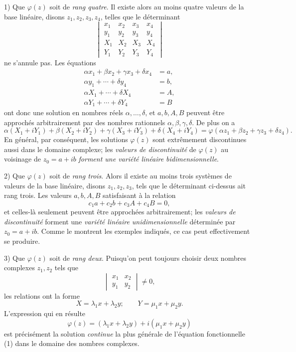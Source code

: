 1) Que $\varphi(z)$ soit de \emph{rang quatre}. Il existe alors au moins quatre valeurs de la base linéaire, disons $z_1,z_2,z_3,z_4$, telles que le déterminant
\[
\begin{vmatrix}
x_1&x_2&x_3&x_4\\
y_1&y_2&y_3&y_4\\
X_1&X_2&X_3&X_4\\
Y_1&Y_2&Y_3&Y_4
\end{vmatrix}
\]
ne s'annule pas. Les équations
\[
\begin{aligned}
\alpha x_1+\beta x_2+\gamma x_3+\delta x_4&=a,\\
\alpha y_1+\cdots+\delta y_4&=b,\\
\alpha X_1+\cdots+\delta X_4&=A,\\
\alpha Y_1+\cdots+\delta Y_4&=B
\end{aligned}
\]
ont donc une solution en nombres réels $\alpha,\ldots,\delta$, et $a,b,A,B$ peuvent être approchés arbitrairement par des nombres rationnels $\alpha,\beta,\gamma,\delta$. De plus on a
\[
\alpha(X_1+iY_1)+\beta(X_2+iY_2)+\gamma(X_3+iY_3)+\delta(X_4+iY_4)
 =\varphi(\alpha z_1+\beta z_2+\gamma z_3+\delta z_4).
\]
\og{}En général\fg{}, par conséquent, les solutions $\varphi(z)$ sont extrêmement discontinues aussi dans le domaine complexe; les \emph{valeurs de discontinuité} de $\varphi(z)$ au voisinage de $z_0=a+ib$ \emph{forment une variété linéaire bidimensionnelle}.

2) Que $\varphi(z)$ soit de \emph{rang trois}. Alors il existe au moins trois systèmes de valeurs de la base linéaire, disons $z_1,z_2,z_3$, tels que le déterminant ci-dessus ait rang trois. Les valeurs $a,b,A,B$ satisfaisant à la relation
\[
c_1a+c_2b+c_3A+c_4B=0,
\]
et celles-là seulement peuvent être approchées arbitrairement; les \emph{valeurs de discontinuité} forment une \emph{variété linéaire unidimensionnelle} déterminée par $z_0=a+ib$. Comme le montrent les exemples indiqués, ce cas peut effectivement se produire.

3) Que $\varphi(z)$ soit de \emph{rang deux}. Puisqu'on peut toujours choisir deux nombres complexes $z_1,z_2$ tels que
\[
\begin{vmatrix}x_1&x_2\\ y_1&y_2\end{vmatrix}\ne0,
\]
les relations ont la forme
\[
X=\lambda_1x+\lambda_2y;\qquad Y=\mu_1x+\mu_2y.
\]
L'expression qui en résulte
\[
\varphi(z)=(\lambda_1x+\lambda_2y)+i(\mu_1x+\mu_2y)
\]
est précisément la solution \emph{continue} la plus générale de l'équation fonctionnelle (1) dans le domaine des nombres complexes.

